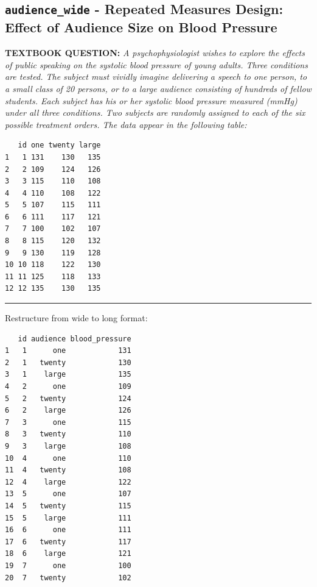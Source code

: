 \documentclass[]{article}
\begin{document}
\clearpage

\subsection{\texorpdfstring{\texttt{audience\_wide} - Repeated Measures
Design: Effect of Audience Size on Blood
Pressure}{audience\_wide - Repeated Measures Design: Effect of Audience Size on Blood Pressure}}\label{audience_wide---repeated-measures-design-effect-of-audience-size-on-blood-pressure}

\textbf{TEXTBOOK QUESTION:} \emph{A psychophysiologist wishes to explore
the effects of public speaking on the systolic blood pressure of young
adults. Three conditions are tested. The subject must vividly imagine
delivering a speech to one person, to a small class of 20 persons, or to
a large audience consisting of hundreds of fellow students. Each subject
has his or her systolic blood pressure measured (mmHg) under all three
conditions. Two subjects are randomly assigned to each of the six
possible treatment orders. The data appear in the following table:}

\begin{verbatim}
   id one twenty large
1   1 131    130   135
2   2 109    124   126
3   3 115    110   108
4   4 110    108   122
5   5 107    115   111
6   6 111    117   121
7   7 100    102   107
8   8 115    120   132
9   9 130    119   128
10 10 118    122   130
11 11 125    118   133
12 12 135    130   135
\end{verbatim}

\begin{center}\rule{0.5\linewidth}{\linethickness}\end{center}

Restructure from wide to long format:

\begin{verbatim}
   id audience blood_pressure
1   1      one            131
2   1   twenty            130
3   1    large            135
4   2      one            109
5   2   twenty            124
6   2    large            126
7   3      one            115
8   3   twenty            110
9   3    large            108
10  4      one            110
11  4   twenty            108
12  4    large            122
13  5      one            107
14  5   twenty            115
15  5    large            111
16  6      one            111
17  6   twenty            117
18  6    large            121
19  7      one            100
20  7   twenty            102
\end{verbatim}
\end{document}
